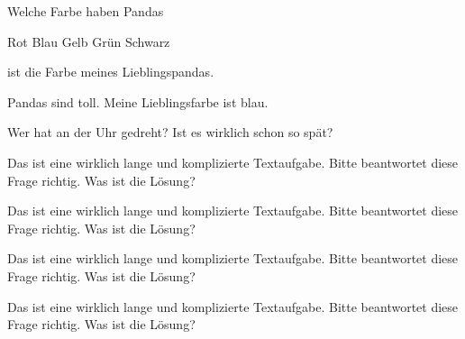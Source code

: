 \documentclass[addpoints,a4paper,12pt]{exam} %
\begin{document}
\begin{questions}
		
		\question
		Welche Farbe haben Pandas
		\begin{checkboxes}
			\CorrectChoice Rot
			\choice Blau
			\choice Gelb
			\choice Grün
			\CorrectChoice Schwarz
		\end{checkboxes}
		
		\question \fillin[Rot][3cm] ist die Farbe meines Lieblingspandas.
		
		\newcommand{\tf}[1][{}]{%
		\fillin[#1][0.25in]%
		}
		\question \tf[T] Pandas sind toll.
		\question \tf[F] Meine Lieblingsfarbe ist blau.
		
		\question[2]
		Wer hat an der Uhr gedreht?
		\answerline[Ich]
		Ist es wirklich schon so spät?
		\answerline[Ja]
		
		
		\question Das ist eine wirklich lange und komplizierte Textaufgabe. Bitte beantwortet diese Frage richtig. Was ist die Lösung?
		\vspace{2cm}
		
		\question Das ist eine wirklich lange und komplizierte Textaufgabe. Bitte beantwortet diese Frage richtig. Was ist die Lösung?
		\makeemptybox{2cm}
		
		\question Das ist eine wirklich lange und komplizierte Textaufgabe. Bitte beantwortet diese Frage richtig. Was ist die Lösung?
		\fillwithlines{2cm}
		
		\question Das ist eine wirklich lange und komplizierte Textaufgabe. Bitte beantwortet diese Frage richtig. Was ist die Lösung?
		\fillwithdottedlines{2cm}
		

\end{questions}
\end{document}

